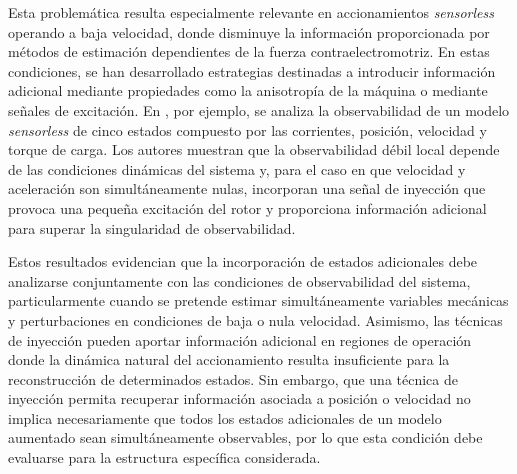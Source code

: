 
Esta problemática resulta especialmente relevante en accionamientos \textit{sensorless} operando a baja velocidad, donde disminuye la información proporcionada por métodos de estimación dependientes de la fuerza contraelectromotriz. En estas condiciones, se han desarrollado estrategias destinadas a introducir información adicional mediante propiedades como la anisotropía de la máquina o mediante señales de excitación. En \cite{zgorskiSensorlessPositionControl2013}, por ejemplo, se analiza la observabilidad de un modelo \textit{sensorless} de cinco estados compuesto por las corrientes, posición, velocidad y torque de carga. Los autores muestran que la observabilidad débil local depende de las condiciones dinámicas del sistema y, para el caso en que velocidad y aceleración son simultáneamente nulas, incorporan una señal de inyección que provoca una pequeña excitación del rotor y proporciona información adicional para superar la singularidad de observabilidad.



Estos resultados evidencian que la incorporación de estados adicionales debe analizarse conjuntamente con las condiciones de observabilidad del sistema, particularmente cuando se pretende estimar simultáneamente variables mecánicas y perturbaciones en condiciones de baja o nula velocidad. Asimismo, las técnicas de inyección pueden aportar información adicional en regiones de operación donde la dinámica natural del accionamiento resulta insuficiente para la reconstrucción de determinados estados. Sin embargo, que una técnica de inyección permita recuperar información asociada a posición o velocidad no implica necesariamente que todos los estados adicionales de un modelo aumentado sean simultáneamente observables, por lo que esta condición debe evaluarse para la estructura específica considerada.



